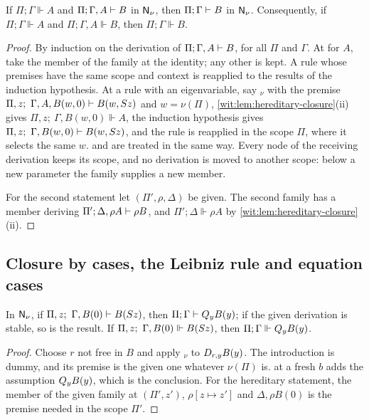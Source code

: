 \begin{lemma}
\label{wit:lem:uniform-cut}
If $\Pi;\Gamma\Vdash A$ and $\Pi;\Gamma,A\vdash B$ in $\mathsf{N}_{\nu}$, then
$\Pi;\Gamma\vdash B$ in $\mathsf{N}_{\nu}$.  Consequently, if
$\Pi;\Gamma\Vdash A$ and $\Pi;\Gamma,A\Vdash B$, then $\Pi;\Gamma\Vdash B$.
\end{lemma}

\begin{proof}
By induction on the derivation of $\Pi;\Gamma,A\vdash B$, for all $\Pi$ and
$\Gamma$.  At  for $A$, take the member of the family at the
identity; any other  is kept.  A rule whose premises have the
same scope and context is reapplied to the results of the induction
hypothesis.  At a rule with an eigenvariable, say $_\nu$ with
the premise $\Pi,z;\ \Gamma,A,B(w,0)\proves B(w,\Suc z)$ and $w=\nu(\Pi)$,
\cref{wit:lem:hereditary-closure}(ii) gives
$\Pi,z;\ \Gamma,B(w,0)\Vdash A$, the induction hypothesis gives
$\Pi,z;\ \Gamma,B(w,0)\proves B(w,\Suc z)$, and the rule is reapplied in the
scope $\Pi$, where it selects the same $w$.   and
 are treated in the same way.  Every node of the receiving
derivation keeps its scope, and no derivation is moved to another scope:
below a new parameter the family supplies a new member.

For the second statement let $(\Pi',\rho,\Delta)$ be given.  The second
family has a member deriving $\Pi';\Delta,\rho A\vdash\rho B$, and
$\Pi';\Delta\Vdash\rho A$ by \cref{wit:lem:hereditary-closure}(ii).
\end{proof}

\subsection{Closure by cases, the Leibniz rule and equation cases}

\begin{lemma}
\label{wit:lem:qc}
In $\mathsf{N}_{\nu}$, if $\Pi,z;\ \Gamma,B(0)\vdash B(S z)$, then
$\Pi;\Gamma\vdash Q_{y}B(y)$; if the given derivation is stable, so is the
result.  If $\Pi,z;\ \Gamma,B(0)\Vdash B(S z)$, then
$\Pi;\Gamma\Vdash Q_{y}B(y)$.
\end{lemma}

\begin{proof}
Choose $r$ not free in $B$ and apply $_\nu$ to $D_{r,y}B(y)$.
The introduction is dummy, and its premise is the given one whatever
$\nu(\Pi)$ is.   at a fresh $b$ adds the assumption
$Q_{y}B(y)$, which is the conclusion.  For the hereditary statement, the
member of the given family at $(\Pi',z')$, $\rho[z\mapsto z']$ and
$\Delta,\rho B(0)$ is the premise needed in the scope $\Pi'$.
\end{proof}

